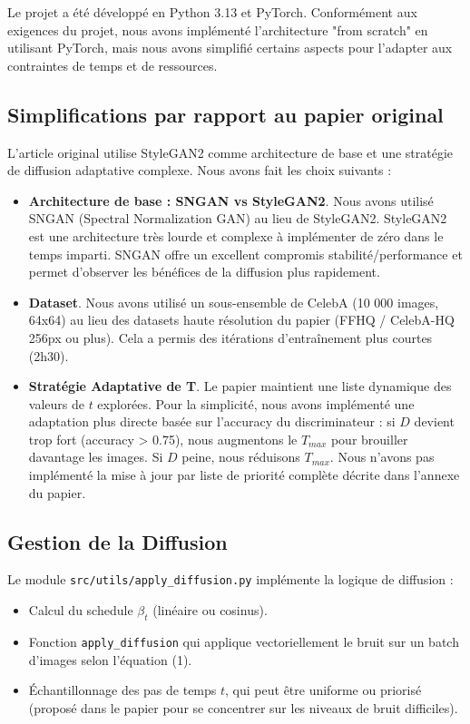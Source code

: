 \documentclass[a4paper,11pt]{article}
\begin{document}
Le projet a été développé en Python 3.13 et PyTorch. Conformément aux exigences du projet, nous avons implémenté l’architecture "from scratch" en utilisant PyTorch, mais nous avons simplifié certains aspects pour l'adapter aux contraintes de temps et de ressources.

\subsection{Simplifications par rapport au papier original}
L'article original utilise StyleGAN2 comme architecture de base et une stratégie de diffusion adaptative complexe. Nous avons fait les choix suivants :

\begin{itemize}
    \item \textbf{Architecture de base : SNGAN vs StyleGAN2}. Nous avons utilisé SNGAN (Spectral Normalization GAN) au lieu de StyleGAN2. StyleGAN2 est une architecture très lourde et complexe à implémenter de zéro dans le temps imparti. SNGAN offre un excellent compromis stabilité/performance et permet d'observer les bénéfices de la diffusion plus rapidement.
    \item \textbf{Dataset}. Nous avons utilisé un sous-ensemble de CelebA (10 000 images, 64x64) au lieu des datasets haute résolution du papier (FFHQ / CelebA-HQ 256px ou plus). Cela a permis des itérations d'entraînement plus courtes (2h30).
    \item \textbf{Stratégie Adaptative de T}. Le papier maintient une liste dynamique des valeurs de $t$ explorées. Pour la simplicité, nous avons implémenté une adaptation plus directe basée sur l'accuracy du discriminateur : si $D$ devient trop fort (accuracy > 0.75), nous augmentons le $T_{max}$ pour brouiller davantage les images. Si $D$ peine, nous réduisons $T_{max}$. Nous n'avons pas implémenté la mise à jour par liste de priorité complète décrite dans l'annexe du papier.
\end{itemize}

\subsection{Gestion de la Diffusion}
Le module \texttt{src/utils/apply\_diffusion.py} implémente la logique de diffusion :
\begin{itemize}
    \item Calcul du schedule $\beta_t$ (linéaire ou cosinus).
    \item Fonction \texttt{apply\_diffusion} qui applique vectoriellement le bruit sur un batch d'images selon l'équation (1).
    \item Échantillonnage des pas de temps $t$, qui peut être uniforme ou priorisé (proposé dans le papier pour se concentrer sur les niveaux de bruit difficiles).
\end{itemize}
\end{document}
